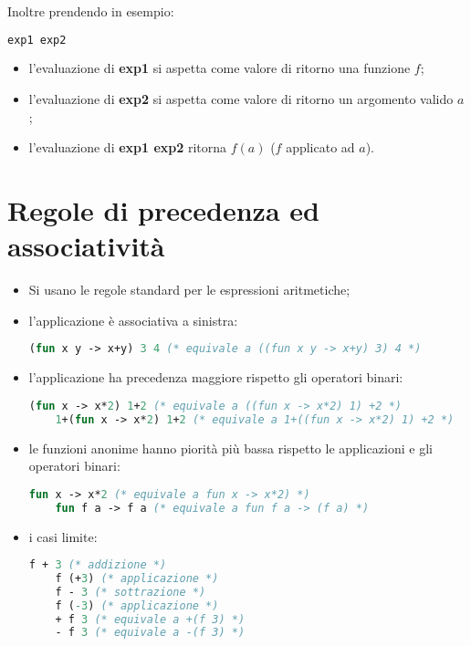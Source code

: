 Inoltre prendendo in esempio:
\begin{lstlisting}[language=Caml, caption={Esempio di applicazioni}]
  exp1 exp2
\end{lstlisting}
\begin{itemize}
  \item l'evaluazione di \textbf{exp1} si aspetta come valore di ritorno una
    funzione $f$;
  \item l'evaluazione di \textbf{exp2} si aspetta come valore di ritorno un
    argomento valido $a$;
  \item l'evaluazione di \textbf{exp1 exp2} ritorna $f(a)$ ($f$ applicato ad
    $a$).
\end{itemize}

\section{Regole di precedenza ed associatività}
\begin{itemize}
  \item Si usano le regole standard per le espressioni aritmetiche;
  \item l'applicazione è associativa a sinistra:
    \begin{lstlisting}[language=Caml, caption={Esempio di associatività}]
    (fun x y -> x+y) 3 4 (* equivale a ((fun x y -> x+y) 3) 4 *)
    \end{lstlisting}
  \item l'applicazione ha precedenza maggiore rispetto gli operatori binari:
    \begin{lstlisting}[language=Caml, caption={Esempio di precedenza}]
    (fun x -> x*2) 1+2 (* equivale a ((fun x -> x*2) 1) +2 *)
    1+(fun x -> x*2) 1+2 (* equivale a 1+((fun x -> x*2) 1) +2 *)
    \end{lstlisting}
  \item le funzioni anonime hanno piorità più bassa rispetto le applicazioni
    e gli operatori binari:
    \begin{lstlisting}[language=Caml, caption={Esempio di precedenza}]
    fun x -> x*2 (* equivale a fun x -> x*2) *)
    fun f a -> f a (* equivale a fun f a -> (f a) *)
    \end{lstlisting}
  \item i casi limite:
    \begin{lstlisting}[language=Caml, caption={Casi limite di precedenza}]
    f + 3 (* addizione *)
    f (+3) (* applicazione *)
    f - 3 (* sottrazione *)
    f (-3) (* applicazione *)
    + f 3 (* equivale a +(f 3) *)
    - f 3 (* equivale a -(f 3) *)
    \end{lstlisting}
\end{itemize}

